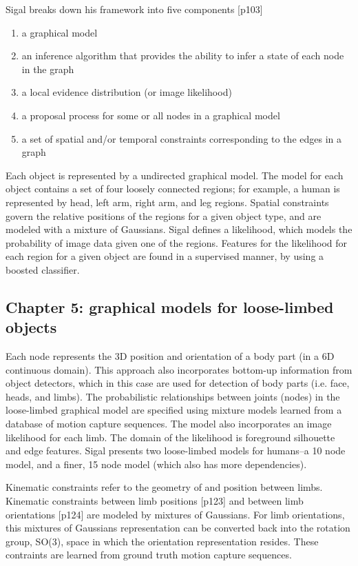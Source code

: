\documentclass{article}
\begin{document}
Sigal breaks down his framework into five components [p103]
\begin{enumerate} 
\item a graphical model
\item an inference algorithm that provides the ability to infer a state of each node in the graph
\item a local evidence distribution (or image likelihood)
\item a proposal process for some or all nodes in a graphical model
\item a set of spatial and/or temporal constraints corresponding to the edges in a graph
\end{enumerate}
Each object is represented by a undirected graphical model. The model for each object contains a set of four loosely connected regions; for example, a human is represented by head, left arm, right arm, and leg regions. Spatial constraints govern the relative positions of the regions for a given object type, and are modeled with a mixture of Gaussians. Sigal defines a likelihood, which models the probability of image data given one of the regions. Features for the likelihood for each region for a given object are found in a supervised manner, by using a boosted classifier.


\subsection{Chapter 5: graphical models for loose-limbed objects}
\label{sec:sigal_chap5}

Each node represents the 3D position and orientation of a body part (in a 6D continuous domain).
This approach also incorporates bottom-up information from object detectors, which in this case are used for detection of body parts (i.e. face, heads, and limbs).
The probabilistic relationships between joints (nodes) in the loose-limbed graphical model are specified using mixture models learned from a database of motion capture sequences.
The model also incorporates an image likelihood for each limb. The domain of the likelihood is foreground silhouette and edge features.
Sigal presents two loose-limbed models for humans--a 10 node model, and a finer, 15 node model (which also has more dependencies).

Kinematic constraints refer to the geometry of and position between limbs. Kinematic constraints between limb positions [p123] and between limb orientations [p124] are modeled by mixtures of Gaussians.
For limb orientations, this mixtures of Gaussians representation can be converted back into the rotation group, SO(3), space in which the orientation representation resides.
These contraints are learned from ground truth motion capture sequences.
\end{document}
